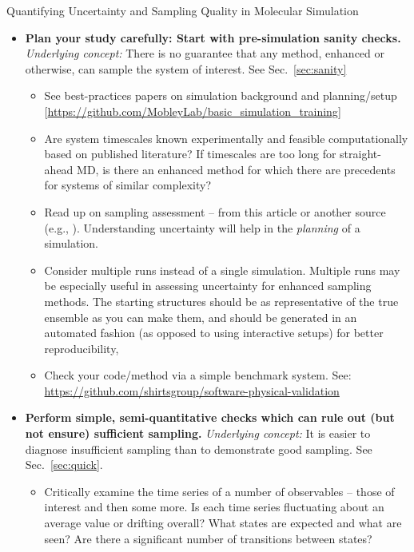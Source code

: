 \documentclass[9pt,bestpractices]{livecoms}
\begin{document}
\begin{Checklists*}[p!]
\begin{checklist}{Quantifying Uncertainty and Sampling Quality in Molecular Simulation}
\begin{itemize}
\item
\textbf{Plan your study carefully: Start with pre-simulation sanity checks.}  \emph{Underlying concept:} There is no guarantee that any method, enhanced or otherwise, can sample the system of interest.  See Sec.\ \ref{sec:sanity}
    \begin{itemize}
    \item See best-practices papers on simulation background and planning/setup [\url{https://github.com/MobleyLab/basic_simulation_training}]
    \item Are system timescales known experimentally and feasible computationally based on published literature?
      If timescales are too long for straight-ahead MD, is there an enhanced method for which there are precedents for systems of similar complexity?
    \item Read up on sampling assessment -- from this article or another source (e.g., \cite{Grossfield2009}).  Understanding uncertainty will help in the \emph{planning} of a simulation.
    \item Consider multiple runs instead of a single simulation.  Multiple runs may be especially useful in assessing uncertainty for enhanced sampling methods.  The starting structures should be as representative of the true ensemble as you can make them, and should be generated in an automated fashion (as opposed to using interactive setups) for better reproducibility,
    \item Check your code/method via a simple benchmark system.  See: \url{https://github.com/shirtsgroup/software-physical-validation}
    \end{itemize}
\item
\textbf{Perform simple, semi-quantitative checks which can rule out (but not ensure) sufficient sampling.} \emph{Underlying concept:} It is easier to diagnose insufficient sampling than to demonstrate good sampling.  See Sec.\ \ref{sec:quick}.
    \begin{itemize}
    \item Critically examine the time series of a number of observables -- those of interest and then some more.  Is each time series fluctuating about an average value or drifting overall?  What states are expected and what are seen?  Are there a significant number of transitions between states?

\end{itemize}
\end{itemize}
\end{checklist}
\end{Checklists*}
\end{document}
